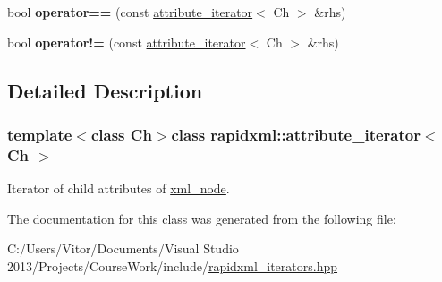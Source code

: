 \begin{DoxyCompactItemize}
\item 
\hypertarget{classrapidxml_1_1attribute__iterator_ab1dc8dd11d21e145a4e3f76d46aead0d}{}bool {\bfseries operator==} (const \hyperlink{classrapidxml_1_1attribute__iterator}{attribute\+\_\+iterator}$<$ Ch $>$ \&rhs)\label{classrapidxml_1_1attribute__iterator_ab1dc8dd11d21e145a4e3f76d46aead0d}

\item 
\hypertarget{classrapidxml_1_1attribute__iterator_a39e8cf336c324521fd9c720abf280d88}{}bool {\bfseries operator!=} (const \hyperlink{classrapidxml_1_1attribute__iterator}{attribute\+\_\+iterator}$<$ Ch $>$ \&rhs)\label{classrapidxml_1_1attribute__iterator_a39e8cf336c324521fd9c720abf280d88}

\end{DoxyCompactItemize}


\subsection{Detailed Description}
\subsubsection*{template$<$class Ch$>$class rapidxml\+::attribute\+\_\+iterator$<$ Ch $>$}

Iterator of child attributes of \hyperlink{classrapidxml_1_1xml__node}{xml\+\_\+node}. 

The documentation for this class was generated from the following file\+:\begin{DoxyCompactItemize}
\item 
C\+:/\+Users/\+Vitor/\+Documents/\+Visual Studio 2013/\+Projects/\+Course\+Work/include/\hyperlink{rapidxml__iterators_8hpp}{rapidxml\+\_\+iterators.\+hpp}\end{DoxyCompactItemize}
